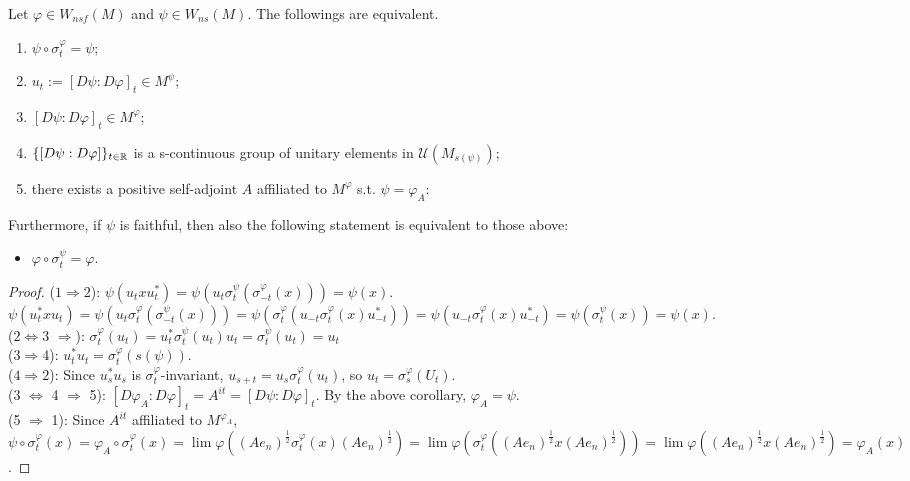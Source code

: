 \begin{theorem}
  Let $\varphi \in W_{nsf}(M)$ and $\psi \in W_{ns}(M)$. The followings are equivalent.
  \begin{enumerate}
    \item $\psi \circ \sigma_t^\varphi = \psi$;
    \item $u_t:=[D\psi:D\varphi]_t \in M^\psi$;
    \item $[D\psi:D\varphi]_t \in M^\varphi$;
    \item $\{[D\psi:D\varphi]\}_{t \in \mathbb{R}}$ is a s-continuous group of unitary elements in $\mathcal{U}(M_{s(\psi)})$;
    \item there exists a positive self-adjoint $A$ affiliated to $M^\varphi$ s.t. $\psi = \varphi_A$:
  \end{enumerate}
  Furthermore, if $\psi$ is faithful, then also the following statement is equivalent to those above:
  \begin{itemize}
    \item $\varphi \circ \sigma_t^\psi = \varphi$.
  \end{itemize}
\end{theorem}

\begin{proof}
  ($1 \Rightarrow 2$):
  $\psi(u_t x u_t^*)
  = \psi(u_t \sigma_t^\psi(\sigma_{-t}^\varphi(x)))
  = \psi(x)$.\\
  $\psi(u_t^*xu_t)
  = \psi(u_t \sigma_t^\varphi(\sigma_{-t}^\psi(x)))
  = \psi(\sigma_t^\varphi(u_{-t}\sigma_t^\varphi(x)u_{-t}^*))
  = \psi(u_{-t}\sigma_t^\varphi(x)u_{-t}^*)
  = \psi(\sigma_t^\psi(x)) = \psi (x)$.\\
  ($2 \Leftrightarrow 3$ $\Rightarrow$):
  $\sigma_t^\varphi(u_t)
  = u_t^*\sigma_t^\psi(u_t)u_t
  = \sigma_t^\psi(u_t)
  = u_t$\\
  ($3 \Rightarrow 4$):
  $u_t^*u_t = \sigma_t^\varphi(s(\psi))$.\\
  ($4 \Rightarrow 2$):
  Since $u_s^*u_s$ is $\sigma_t^\varphi$-invariant,
  $u_{s+t} = u_s \sigma_t^\varphi(u_t)$, 
  so $u_t = \sigma_s^\varphi(U_t)$.\\
  (3 $\Leftrightarrow$ 4 $\Rightarrow$ 5):
  $[D\varphi_A:D\varphi]_t = A^{it} = [D\psi:D\varphi]_t$. 
  By the above corollary, $\varphi_A = \psi$.\\
  (5 $\Rightarrow$ 1):
  Since $A^{it}$ affiliated to $M^{\varphi_A}$,
  $\psi \circ \sigma_t^\varphi(x)
  = \varphi_A \circ \sigma_t^\varphi(x)
  = \lim \varphi((Ae_n)^{\frac{1}{2}}\sigma_t^{\varphi}(x)(Ae_n)^{\frac{1}{2}})
  = \lim \varphi(\sigma_t^\varphi((Ae_n)^{\frac{1}{2}}x(Ae_n)^{\frac{1}{2}}))
  = \lim \varphi((Ae_n)^{\frac{1}{2}}x(Ae_n)^{\frac{1}{2}})
  = \varphi_A(x)$.
\end{proof}

